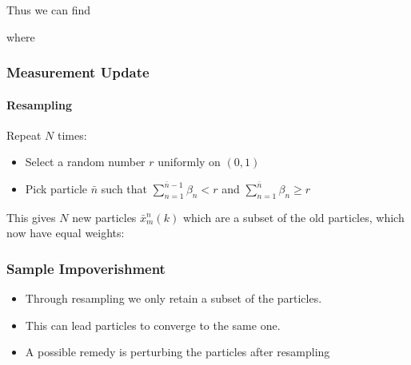 \documentclass[10pt,a4paper]{scrartcl}
\begin{document}
\begin{multicols*}{2}
\begin{multicols*}{3}

Thus we can find 


where 


\subsubsection{Measurement Update}



\paragraph{Resampling}

Repeat $N$ times:
\begin{itemize}
\item Select a random number $r$ uniformly on $(0,1)$
\item Pick particle $\bar{n}$ such that $\sum\limits_{n=1}^{\bar{n}-1}\beta_n < r$ and $\sum\limits_{n=1}^{\bar{n}}\beta_n\geq r$
\end{itemize}

This gives $N$ new particles $\bar{x}_m^n(k)$ which are a subset of the old particles, which now have equal weights:


\subsubsection{Sample Impoverishment}

\begin{itemize}
\item Through resampling we only retain a subset of the particles.
\item This can lead particles to converge to the same one.
\item A possible remedy is perturbing the particles after resampling


\end{itemize}
\end{multicols*}
\end{multicols*}
\end{document}
